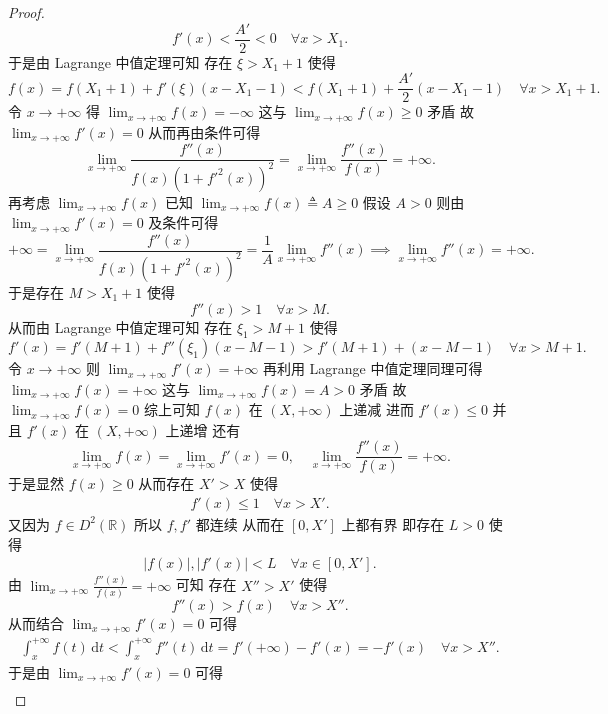 \documentclass[../../main.tex]{subfiles}
\begin{document}
\begin{proof}
\[
f'(x) < \frac{A'}{2} < 0 \quad \forall x > X_1.
\]
于是由 Lagrange 中值定理可知 存在 \( \xi > X_1 + 1 \) 使得
\[
f(x) = f(X_1 + 1) + f'(\xi)(x - X_1 - 1) < f(X_1 + 1) + \frac{A'}{2}(x - X_1 - 1) \quad \forall x > X_1 + 1.
\]
令 \( x \to +\infty \) 得 \( \lim_{x \to +\infty} f(x) = -\infty \) 这与 \( \lim_{x \to +\infty} f(x) \geqslant 0 \) 矛盾 故 \( \lim_{x \to +\infty} f'(x) = 0 \) 从而再由条件可得
\[
\lim_{x \to +\infty} \frac{f''(x)}{f(x)(1 + f'^2(x))^2} = \lim_{x \to +\infty} \frac{f''(x)}{f(x)} = +\infty.
\]
再考虑 \( \lim_{x \to +\infty} f(x) \) 已知 \( \lim_{x \to +\infty} f(x) \triangleq A \geqslant 0 \) 假设 \( A > 0 \) 则由 \( \lim_{x \to +\infty} f'(x) = 0 \) 及条件可得
\[
+\infty = \lim_{x \to +\infty} \frac{f''(x)}{f(x)(1 + f'^2(x))^2} = \frac{1}{A} \lim_{x \to +\infty} f''(x) \implies \lim_{x \to +\infty} f''(x) = +\infty.
\]
于是存在 \( M > X_1 + 1 \) 使得
\[
f''(x) > 1 \quad \forall x > M.
\]
从而由 Lagrange 中值定理可知 存在 \( \xi_1 > M + 1 \) 使得
\[
f'(x) = f'(M + 1) + f''(\xi_1)(x - M - 1) > f'(M + 1) + (x - M - 1) \quad \forall x > M + 1.
\]
令 \( x \to +\infty \) 则 \( \lim_{x \to +\infty} f'(x) = +\infty \) 再利用 Lagrange 中值定理同理可得 \( \lim_{x \to +\infty} f(x) = +\infty \) 这与 \( \lim_{x \to +\infty} f(x) = A > 0 \) 矛盾 故 \( \lim_{x \to +\infty} f(x) = 0 \) 综上可知 \( f(x) \) 在 \( (X, +\infty) \) 上递减 进而 \( f'(x) \leqslant 0 \) 并且 \( f'(x) \) 在 \( (X, +\infty) \) 上递增 还有
\[
\lim_{x \to +\infty} f(x) = \lim_{x \to +\infty} f'(x) = 0, \quad \lim_{x \to +\infty} \frac{f''(x)}{f(x)} = +\infty.
\]
于是显然 \( f(x) \geqslant 0 \) 从而存在 \( X' > X \) 使得
\begin{align}
f'(x) \leqslant 1 \quad \forall x > X' \label{100.21}.
\end{align}
又因为 \( f \in D^2(\mathbb{R}) \) 所以 \( f, f' \) 都连续 从而在 \( [0, X'] \) 上都有界 即存在 \( L > 0 \) 使得
\begin{align}
|f(x)|, |f'(x)| < L \quad \forall x \in [0, X'] \label{100.20}.
\end{align}
由 \( \lim_{x \to +\infty} \frac{f''(x)}{f(x)} = +\infty \) 可知 存在 \( X'' > X' \) 使得
\[
f''(x) > f(x) \quad \forall x > X''.
\]
从而结合 \( \lim_{x \to +\infty} f'(x) = 0 \) 可得
\begin{align}
\int_x^{+\infty} f(t) \, \mathrm{d}t < \int_x^{+\infty} f''(t) \, \mathrm{d}t = f'(+\infty) - f'(x) = -f'(x) \quad \forall x > X'' \label{100.18}.
\end{align}
于是由 \( \lim_{x \to +\infty} f'(x) = 0 \) 可得
\begin{align}

\end{align}
\end{proof}
\end{document}

